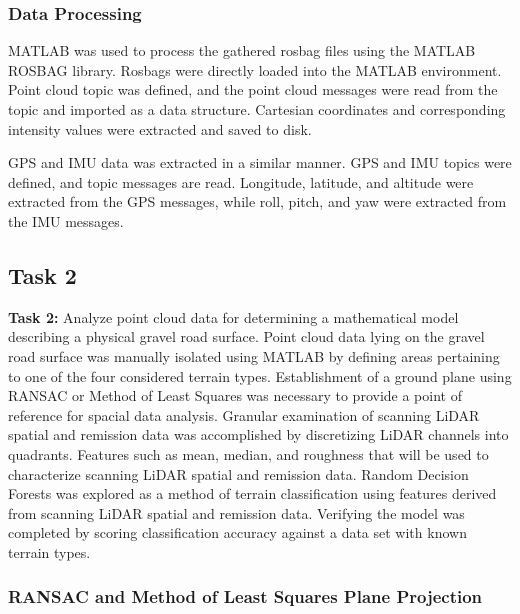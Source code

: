 \documentclass[numbered,pdftex]{ohio-etd}
\begin{document}
{{{{			} %
				
			\subsubsection{Data Processing}\label{sec:data_processing}{

				{MATLAB was used to process the gathered rosbag files using the MATLAB ROSBAG library. Rosbags were directly loaded into the MATLAB environment. Point cloud topic was defined, and the point cloud messages were read from the topic and imported as a data structure. Cartesian coordinates and corresponding intensity values were extracted and saved to disk.}
				
				{GPS and IMU data was extracted in a similar manner. GPS and IMU topics were defined, and topic messages are read. Longitude, latitude, and altitude were extracted from the GPS messages, while roll, pitch, and yaw were extracted from the IMU messages.}
		
			} %
				
		} %

		\subsection{Task 2}{

			\textbf{Task 2: }{Analyze point cloud data for determining a mathematical model describing a physical gravel road surface. Point cloud data lying on the gravel road surface was manually isolated using MATLAB by defining areas pertaining to one of the four considered terrain types. Establishment of a ground plane using RANSAC or Method of Least Squares was necessary to provide a point of reference for spacial data analysis. Granular examination of scanning LiDAR spatial and remission data was accomplished by discretizing LiDAR channels into quadrants. Features such as mean, median, and roughness that will be used to characterize scanning LiDAR spatial and remission data. Random Decision Forests was explored as a method of terrain classification using features derived from scanning LiDAR spatial and remission data. Verifying the model was completed by scoring classification accuracy against a  data set with known terrain types.}
			
			\subsubsection{RANSAC and Method of Least Squares Plane Projection}{
				
}}}}
\end{document}

